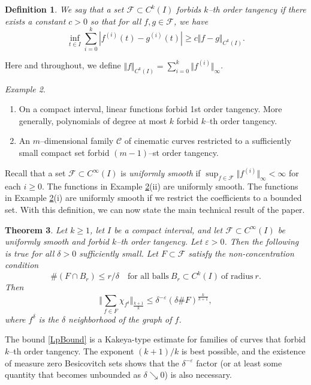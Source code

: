 \documentclass[letterpaper, reqno,11pt]{article}
\numberwithin{equation}{section}
\newcommand{\eps}{\varepsilon}
\newtheorem{thm}{Theorem}
\numberwithin{thm}{section}
\newtheorem{defn}[thm]{Definition}
\theoremstyle{remark}
\newtheorem{example}[thm]{Example}
\begin{document}
\begin{defn}\label{forbidTangencyDefn}
We say that a set $\mathcal{F}\subset C^k(I)$ \emph{forbids $k$--th order tangency} if there exists a constant $c>0$ so that for all $f,g\in \mathcal{F}$, we have
\begin{equation}\label{cinematicFunctionCondition}
\inf_{t\in I} \sum_{i=0}^k |f^{(i)}(t)-g^{(i)}(t)| \geq c \Vert f-g\Vert_{C^k(I)}.
\end{equation}
\end{defn} 
\noindent Here and throughout, we define $\Vert f\Vert_{C^k(I)}=\sum_{i=0}^k \Vert f^{(i)}\Vert_{\infty}$.
\begin{example}\label{forbidTangency}
$\phantom{1}$\smallskip
\begin{enumerate}
    \item[(i)] On a compact interval, linear functions forbid 1st order tangency. More generally, polynomials of degree at most $k$ forbid $k$--th order tangency. 
    \item[(ii)] An $m$--dimensional family $\mathcal{C}$ of cinematic curves restricted to a sufficiently small compact set forbid $(m-1)$--st order tangency.
\end{enumerate}
\end{example}
%

Recall that a set $\mathcal{F}\subset C^\infty(I)$ is \emph{uniformly smooth} if $\sup_{f\in \mathcal{F}}\Vert f^{(i)}\Vert_\infty<\infty$ for each $i\geq 0$. The functions in Example \ref{forbidTangency}(ii) are uniformly smooth. The functions in Example \ref{forbidTangency}(i) are uniformly smooth if we restrict the coefficients to a bounded set. With this definition, we can now state the main technical result of the paper.





\begin{thm}\label{mainThm}
Let $k\geq 1$, let $I$ be a compact interval, and let $\mathcal{F}\subset C^\infty(I)$ be uniformly smooth and forbid $k$--th order tangency. Let $\eps>0$. Then the following is true for all $\delta>0$ sufficiently small. Let $F\subset\mathcal{F}$ satisfy the non-concentration condition
\begin{equation}\label{ballCondition}
\#(F\cap B_r)\leq r/\delta\quad\textrm{for all balls}\ B_r\subset C^k(I)\ \textrm{of radius}\ r.
\end{equation}
Then 
\begin{equation}\label{LpBound}
\Big\Vert \sum_{f\in F} \chi_{f^\delta} \Big\Vert_{\frac{k+1}{k}} \leq \delta^{-\eps}(\delta\#F)^{\frac{k}{k+1}},
\end{equation}
where $f^\delta$ is the $\delta$ neighborhood of the graph of $f$.
\end{thm}
The bound \eqref{LpBound} is a Kakeya-type estimate for families of curves that forbid $k$--th order tangency. The exponent $(k+1)/k$ is best possible, and the existence of measure zero Besicovitch sets shows that the $\delta^{-\eps}$ factor (or at least some quantity that becomes unbounded as $\delta\searrow 0$) is also necessary. 
\end{document}
